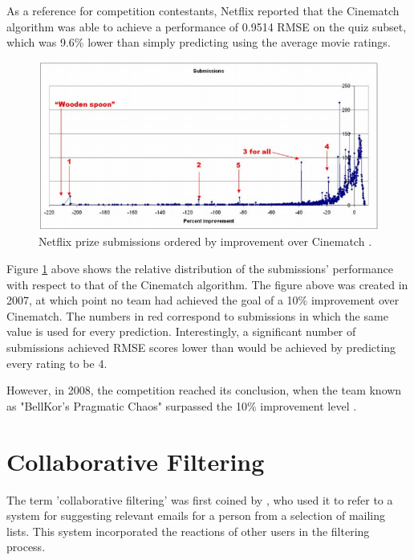 As a reference for competition contestants, Netflix reported that the Cinematch algorithm was able to achieve a performance of 0.9514 RMSE on the quiz subset, which was 9.6\% lower than simply predicting using the average movie ratings. \parencite{netflix_description}

\begin{figure}[H]
\centering
\includegraphics[width=13cm]{Figures/2_1_netflix-prize.png}
\decoRule
\caption[Netflix submissions]{Netflix prize submissions ordered by improvement over Cinematch \parencite{netflix_description}.}
\label{fig:netflix_submissions}
\end{figure}

Figure \ref{fig:netflix_submissions} above shows the relative distribution of the submissions' performance with respect to that of the Cinematch algorithm. The figure above was created in 2007, at which point no team had achieved the goal of a 10\% improvement over Cinematch. The numbers in red correspond to submissions in which the same value is used for every prediction. Interestingly, a significant number of submissions achieved RMSE scores lower than would be achieved by predicting every rating to be 4.

However, in 2008, the competition reached its conclusion, when the team known as "BellKor's Pragmatic Chaos" surpassed the 10\% improvement level \parencite{netflix_bellkor}.

\section{Collaborative Filtering}
The term 'collaborative filtering' was first coined by \cite{cf_1.3_origin}, who used it to refer to a system for suggesting relevant emails for a person from a selection of mailing lists. This system incorporated the reactions of other users in the filtering process.

